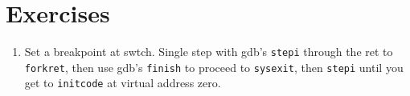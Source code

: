 \section{Exercises}

\begin{enumerate}
  
\item Set a breakpoint at swtch.  Single step with gdb's
\lstinline{stepi}
through the ret to
\lstinline{forkret},
then use gdb's
\lstinline{finish}
to proceed to
\lstinline{sysexit},
then
\lstinline{stepi}
until you get to
\lstinline{initcode} 
at virtual address zero.

\end{enumerate}
